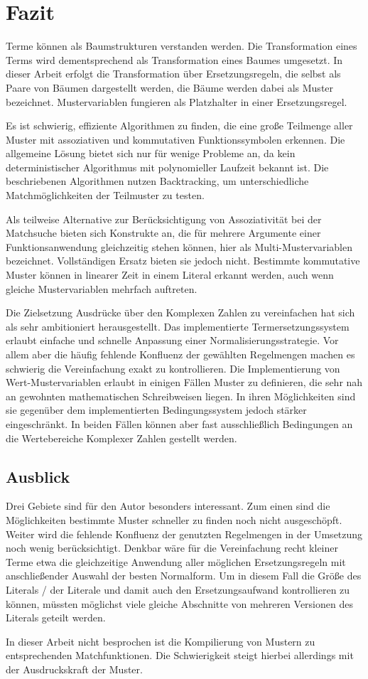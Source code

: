 

\chapter{Fazit} \label{secZusammenfassung}
Terme können als Baumstrukturen verstanden werden. Die Transformation eines Terms wird dementsprechend als Transformation eines Baumes umgesetzt. In dieser Arbeit erfolgt die Transformation über Ersetzungsregeln, die selbst als Paare von Bäumen dargestellt werden, die Bäume werden dabei als Muster bezeichnet. Mustervariablen fungieren als Platzhalter in einer Ersetzungsregel.

Es ist schwierig, effiziente Algorithmen zu finden, die eine große Teilmenge aller Muster mit assoziativen und kommutativen Funktionssymbolen erkennen. Die allgemeine Lösung bietet sich nur für wenige Probleme an, da kein deterministischer Algorithmus mit polynomieller Laufzeit bekannt ist. 
Die beschriebenen Algorithmen nutzen Backtracking, um unterschiedliche Matchmöglichkeiten der Teilmuster zu testen. 

Als teilweise Alternative zur Berücksichtigung von Assoziativität bei der Matchsuche bieten sich Konstrukte an, die für mehrere Argumente einer Funktionsanwendung gleichzeitig stehen können, hier als Multi-Mustervariablen bezeichnet. Vollständigen Ersatz bieten sie jedoch nicht.
Bestimmte kommutative Muster können in linearer Zeit in einem Literal erkannt werden, auch wenn gleiche Mustervariablen mehrfach auftreten. 

Die Zielsetzung Ausdrücke über den Komplexen Zahlen zu vereinfachen hat sich als sehr ambitioniert herausgestellt. Das implementierte Termersetzungssystem erlaubt einfache und schnelle Anpassung einer Normalisierungsstrategie. Vor allem aber die häufig fehlende Konfluenz der gewählten Regelmengen machen es schwierig die Vereinfachung exakt zu kontrollieren. 
Die Implementierung von Wert-Mustervariablen erlaubt in einigen Fällen Muster zu definieren, die sehr nah an gewohnten mathematischen Schreibweisen liegen. In ihren Möglichkeiten sind sie gegenüber dem implementierten Bedingungssystem jedoch stärker eingeschränkt. In beiden Fällen können aber fast ausschließlich Bedingungen an die Wertebereiche Komplexer Zahlen gestellt werden.

\section{Ausblick}
Drei Gebiete sind für den Autor besonders interessant. Zum einen sind die Möglichkeiten bestimmte Muster schneller zu finden noch nicht ausgeschöpft. Weiter wird die fehlende Konfluenz der genutzten Regelmengen in der Umsetzung noch wenig berücksichtigt. Denkbar wäre für die Vereinfachung recht kleiner Terme etwa die gleichzeitige Anwendung aller möglichen Ersetzungsregeln mit anschließender Auswahl der besten Normalform. Um in diesem Fall die Größe des Literals / der Literale und damit auch den Ersetzungsaufwand kontrollieren zu können, müssten möglichst viele gleiche Abschnitte von mehreren Versionen des Literals geteilt werden. 

In dieser Arbeit nicht besprochen ist die Kompilierung von Mustern zu entsprechenden Matchfunktionen. Die Schwierigkeit steigt hierbei allerdings mit der Ausdruckskraft der Muster.






